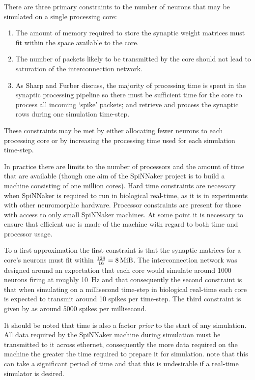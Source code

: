 \documentclass[conference]{IEEEtran}
\begin{document}
  There are three primary constraints to the number of neurons that may be
  simulated on a single processing core:

  \begin{enumerate}
    \item The amount of memory required to store the synaptic weight matrices
      must fit within the space available to the core.
    \item The number of packets likely to be transmitted by the core should not
      lead to saturation of the interconnection network.
    \item As Sharp and Furber \parencite{Sharp2013} discuss, the majority of 
      processing time is spent in the synaptic processing pipeline so there 
      must be sufficient time for the core to process all incoming `spike' 
      packets; and retrieve and process the synaptic rows during one simulation 
      time-step.
  \end{enumerate}

  These constraints may be met by either allocating fewer neurons to each
  processing core or by increasing the processing time used for each simulation
  time-step.
  
  In practice there are limits to the number of processors and the amount of
  time that are available (though one aim of the SpiNNaker project is to build
  a machine consisting of one million cores). Hard time constraints are
  necessary when SpiNNaker is required to run in biological real-time, as it is
  in experiments with other neuromorphic hardware. Processor constraints are
  present for those with access to only small SpiNNaker machines. At some
  point it is necessary to ensure that efficient use is made of the machine
  with regard to both time and processor usage.

  To a first approximation the first constraint is that the synaptic matrices
  for a core's neurons must fit within $\frac{128}{16} = \SI{8}{\mebi\byte}$.
  The interconnection network was designed around an expectation that each core
  would simulate around \num{1000} neurons firing at roughly \SI{10}{\hertz}
  and that consequently the second constraint is that when simulating on a
  millisecond time-step in biological real-time each core is expected to
  transmit around 10 spikes per time-step. The third constraint is given by
  \textcite[\S III.C]{Sharp2013} as around \num{5000} spikes per millisecond.

  It should be noted that time is also a factor \textit{prior} to the start of
  any simulation. All data required by the SpiNNaker machine during simulation
  must be transmitted to it across ethernet, consequently the more data
  required on the machine the greater the time required to prepare it for
  simulation. \textcite{Sharp2013} note that this can take a significant
  period of time and that this is undesirable if a real-time simulator is
  desired.
\end{document}
